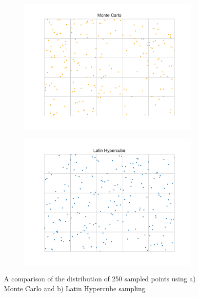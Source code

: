 \documentclass{pasa}%
\begin{document}
\begin{figure}[H]

\begin{subfigure}{.5\textwidth}
  \centering
  \includegraphics[width=\textwidth]{fig/mc.pdf}
  \label{fig:mc}
\end{subfigure}%
\begin{subfigure}{.5\textwidth}
  \centering
  \includegraphics[width=\textwidth]{fig/lh.pdf}
  \label{fig:lh}
\end{subfigure}%

\caption{A comparison of the distribution of 250 sampled points using a) Monte Carlo and b) Latin Hypercube sampling}
\end{figure}
\end{document}
